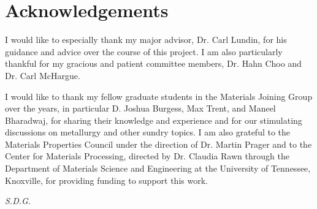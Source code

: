 \chapter*{Acknowledgements}
I would like to especially thank my major advisor, Dr. Carl Lundin, for his guidance and advice over the course of this project. I am also particularly thankful for my gracious and patient committee members, Dr. Hahn Choo and Dr. Carl McHargue. 

I would like to thank my fellow graduate students in the Materials Joining Group over the years, in particular D. Joshua Burgess, Max Trent, and Maneel Bharadwaj, for sharing their knowledge and experience and for our stimulating discussions on metallurgy and other sundry topics. I am also grateful to the Materials Properties Council under the direction of Dr. Martin Prager and to the Center for Materials Processing, directed by Dr. Claudia Rawn through the Department of Materials Science and Engineering at the University of Tennessee, Knoxville, for providing funding to support this work.

\vfill
\centerline{\emph{S.D.G.}}